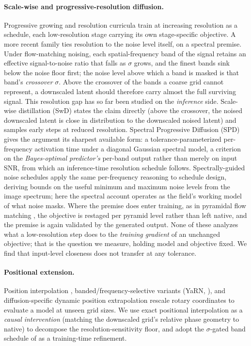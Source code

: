 \paragraph{Scale-wise and progressive-resolution diffusion.}
Progressive growing \citep{karras2018progressive} and resolution curricula
\citep{chen2024pixartalpha,hoogeboom2023simple} train at increasing
resolution as a schedule, each low-resolution stage carrying its own
stage-specific objective. A more recent family ties resolution to the
noise level itself, on a spectral premise. Under flow-matching noising,
each spatial-frequency band of the signal retains an effective
signal-to-noise ratio that falls as $\sigma$ grows, and the finest bands
sink below the noise floor first; the noise level above which a band is
masked is that band's \emph{crossover} $\sigma$. Above the crossover of
the bands a coarse grid cannot represent, a downscaled latent should
therefore carry almost the full surviving signal. This resolution gap
has so far been studied on the \emph{inference} side. Scale-wise
distillation (SwD) \citep{starodubcev2025swd} states the claim
directly (above the crossover, the noised downscaled latent is
close in distribution to the downscaled noised latent) and samples
early steps at reduced resolution. Spectral Progressive Diffusion (SPD)
\citep{xiao2026spd} gives the argument its sharpest available form: a
tolerance-parameterized per-frequency activation time under a diagonal
Gaussian spectral model, a criterion on the \emph{Bayes-optimal
predictor's} per-band output rather than merely on input SNR, from
which an inference-time resolution schedule follows.
Spectrally-guided noise schedules \citep{esteves2026spectral} apply the
same per-frequency reasoning to schedule design, deriving bounds on the
useful minimum and maximum noise levels from the image spectrum; here
the spectral account operates as the field's working model of what
noise masks. Where the premise does enter training, as in pyramidal flow
matching \citep{jin2024pyramidal}, the objective is restaged per
pyramid level rather than left native, and the premise is again
validated by the generated output. None of these analyzes what a
low-resolution step does to the \emph{training gradient} of an
unchanged objective; that is the question we measure, holding model
and objective fixed. We find that input-level closeness does not
transfer at any tolerance.

\paragraph{Positional extension.}
Position interpolation \citep{chen2023pi}, banded/frequency-selective
variants (YaRN, \citealp{peng2024yarn}), and diffusion-specific dynamic
position extrapolation \citep{issachar2025dype,zhao2026sigma} rescale
rotary coordinates to evaluate a model at unseen grid sizes. We use exact
positional interpolation as a \emph{causal intervention} (matching the
downscaled grid's relative phase geometry to native) to decompose the
resolution-sensitivity floor, and adopt the $\sigma$-gated band schedule of
\citet{zhao2026sigma} as a training-time refinement.


